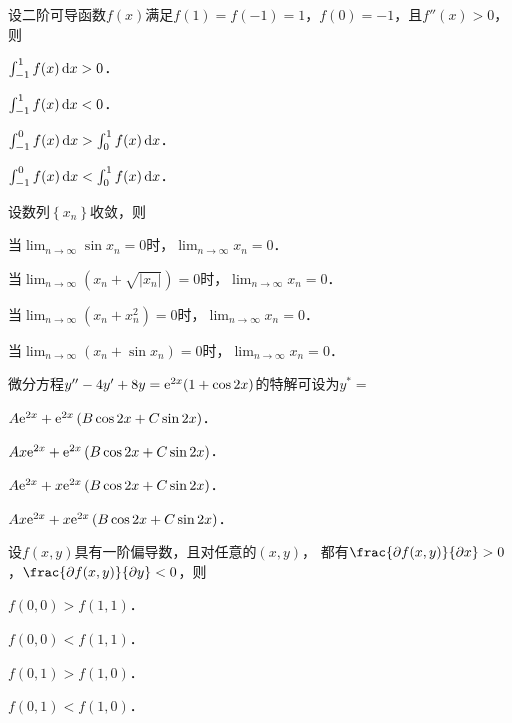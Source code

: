 \documentclass[plain,noanswer,medmath]{../../template/jnuexam}
\begin{document}








\begin{problem}
设二阶可导函数$f(x)$满足$f(1) = f(- 1) = 1$，$f(0) = - 1$，且$f''(x) > 0$，则\pickout{}
\begin{abcd}
\item $\int_{-1}^1 f(x)\mathop{}\!\mathrm{d} x > 0$．
\item $\int_{-1}^1 f(x)\mathop{}\!\mathrm{d} x < 0$．
\item $\int_{-1}^0 f(x)\mathop{}\!\mathrm{d} x > \int_0^1 f(x)\mathop{}\!\mathrm{d} x$．
\item $\int_{-1}^0 f(x)\mathop{}\!\mathrm{d} x < \int_0^1 f(x)\mathop{}\!\mathrm{d} x$．
\end{abcd}
\end{problem}


\begin{problem}
设数列$\left\{x_n \right\}$收敛，则\pickout{}
\begin{abcd}
\item 当$\lim_{n \to \infty} \sin x_n = 0$时，$\lim_{n \to \infty} x_n = 0$．
\item 当$\lim_{n \to \infty} (x_n + \sqrt{\left| x_n \right|}) = 0$时，$\lim_{n \to \infty} x_n = 0$．
\item 当$\lim_{n \to \infty} (x_n + x_n^2) = 0$时，$\lim_{n \to \infty} x_n = 0$．
\item 当$\lim_{n \to \infty} (x_n + \sin x_n) = 0$时，$\lim_{n \to \infty} x_n = 0$．
\end{abcd}
\end{problem}


\begin{problem}
微分方程$y'' - 4y' + 8y = \mathrm{e}^{2x}(1 + \cos 2x)$的特解可设为$y^* =$\pickout{}
\begin{abcd}
\item $A\mathrm{e}^{2x} + \mathrm{e}^{2x}\left(B\cos 2x + C\sin 2x \right)$．
\item $Ax \mathrm{e}^{2x} + \mathrm{e}^{2x}\left(B\cos 2x + C\sin 2x \right)$．
\item $A\mathrm{e}^{2x} + x\mathrm{e}^{2x}\left(B\cos 2x + C\sin 2x \right)$．
\item $Ax \mathrm{e}^{2x} + x\mathrm{e}^{2x}\left(B\cos 2x + C\sin 2x \right)$．
\end{abcd}
\end{problem}


\begin{problem}
设$f(x,y)$具有一阶偏导数，且对任意的$(x,y)$，
都有$\frac{\pd f(x,y)}{\pdx} > 0$，$\frac{\pd f(x,y)}{\pdy} < 0$，则\pickout{}
\begin{abcd}
\item $f(0,0) > f(1,1)$．
\item $f(0,0) < f(1,1)$．
\item $f(0,1) > f(1,0)$．
\item $f(0,1) < f(1,0)$．
\end{abcd}
\end{problem}
\end{document}
